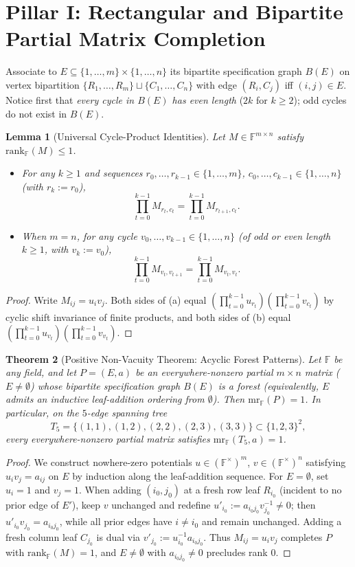 \documentclass[11pt]{article}
\newtheorem{theorem}{Theorem}[section]
\newtheorem{lemma}[theorem]{Lemma}
\theoremstyle{definition}
\newcommand{\F}{\mathbb{F}}
\newcommand{\mr}{\mathrm{mr}}
\newcommand{\rk}{\mathrm{rank}}
\begin{document}
\section{Pillar I: Rectangular and Bipartite Partial Matrix Completion}

Associate to $E \subseteq \{1,\dots,m\}\times\{1,\dots,n\}$ its bipartite specification graph $B(E)$ on vertex bipartition $\{R_1,\dots,R_m\} \sqcup \{C_1,\dots,C_n\}$ with edge $(R_i,C_j)$ iff $(i,j)\in E$. Notice first that \emph{every cycle in $B(E)$ has even length} ($2k$ for $k\ge 2$); odd cycles do not exist in $B(E)$.

\begin{lemma}[Universal Cycle-Product Identities]\label{lem:cycle-prod}
Let $M \in \F^{m\times n}$ satisfy $\rk_{\F}(M) \le 1$.
\begin{itemize}
\item[(a)] For any $k \ge 1$ and sequences $r_0,\dots,r_{k-1} \in \{1,\dots,m\}$, $c_0,\dots,c_{k-1} \in \{1,\dots,n\}$ (with $r_k := r_0$),
\[
\prod_{t=0}^{k-1} M_{r_t, c_t} = \prod_{t=0}^{k-1} M_{r_{t+1}, c_t}.
\]
\item[(b)] When $m=n$, for any cycle $v_0,\dots,v_{k-1} \in \{1,\dots,n\}$ (of odd or even length $k \ge 1$, with $v_k := v_0$),
\[
\prod_{t=0}^{k-1} M_{v_t, v_{t+1}} = \prod_{t=0}^{k-1} M_{v_t, v_t}.
\]
\end{itemize}
\end{lemma}
\begin{proof}
Write $M_{ij} = u_i v_j$. Both sides of (a) equal $(\prod_{t=0}^{k-1} u_{r_t})(\prod_{t=0}^{k-1} v_{c_t})$ by cyclic shift invariance of finite products, and both sides of (b) equal $(\prod_{t=0}^{k-1} u_{v_t})(\prod_{t=0}^{k-1} v_{v_t})$.
\end{proof}

\begin{theorem}[Positive Non-Vacuity Theorem: Acyclic Forest Patterns]\label{thm:forest}
Let $\F$ be any field, and let $P = (E,a)$ be an everywhere-nonzero partial $m\times n$ matrix ($E \neq \emptyset$) whose bipartite specification graph $B(E)$ is a forest (equivalently, $E$ admits an inductive leaf-addition ordering from $\emptyset$). Then $\mr_{\F}(P) = 1$. In particular, on the $5$-edge spanning tree
\[
T_5 = \{(1,1),(1,2),(2,2),(2,3),(3,3)\} \subset \{1,2,3\}^2,
\]
every everywhere-nonzero partial matrix satisfies $\mr_{\F}(T_5,a) = 1$.
\end{theorem}
\begin{proof}
We construct nowhere-zero potentials $u \in (\F^\times)^m$, $v \in (\F^\times)^n$ satisfying $u_i v_j = a_{ij}$ on $E$ by induction along the leaf-addition sequence. For $E = \emptyset$, set $u_i = 1$ and $v_j = 1$. When adding $(i_0,j_0)$ at a fresh row leaf $R_{i_0}$ (incident to no prior edge of $E'$), keep $v$ unchanged and redefine $u'_{i_0} := a_{i_0 j_0} v_{j_0}^{-1} \neq 0$; then $u'_{i_0} v_{j_0} = a_{i_0 j_0}$, while all prior edges have $i \neq i_0$ and remain unchanged. Adding a fresh column leaf $C_{j_0}$ is dual via $v'_{j_0} := u_{i_0}^{-1} a_{i_0 j_0}$. Thus $M_{ij} = u_i v_j$ completes $P$ with $\rk_{\F}(M) = 1$, and $E \neq \emptyset$ with $a_{i_0 j_0}\neq 0$ precludes rank $0$.
\end{proof}
\end{document}
